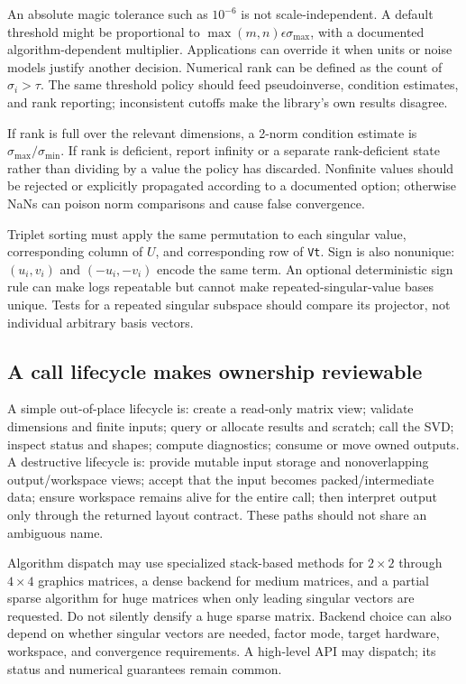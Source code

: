 An absolute magic tolerance such as \(10^{-6}\) is not scale-independent. A default threshold might be proportional to \(\max(m,n)\epsilon\sigma_{\max}\), with a documented algorithm-dependent multiplier. Applications can override it when units or noise models justify another decision. Numerical rank can be defined as the count of \(\sigma_i>\tau\). The same threshold policy should feed pseudoinverse, condition estimates, and rank reporting; inconsistent cutoffs make the library's own results disagree.

If rank is full over the relevant dimensions, a 2-norm condition estimate is \(\sigma_{\max}/\sigma_{\min}\). If rank is deficient, report infinity or a separate rank-deficient state rather than dividing by a value the policy has discarded. Nonfinite values should be rejected or explicitly propagated according to a documented option; otherwise NaNs can poison norm comparisons and cause false convergence.

Triplet sorting must apply the same permutation to each singular value, corresponding column of \(U\), and corresponding row of \texttt{Vt}. Sign is also nonunique: \((u_i,v_i)\) and \((-u_i,-v_i)\) encode the same term. An optional deterministic sign rule can make logs repeatable but cannot make repeated-singular-value bases unique. Tests for a repeated singular subspace should compare its projector, not individual arbitrary basis vectors.

\subsection{A call lifecycle makes ownership reviewable}\label{a-call-lifecycle-makes-ownership-reviewable}

A simple out-of-place lifecycle is: create a read-only matrix view; validate dimensions and finite inputs; query or allocate results and scratch; call the SVD; inspect status and shapes; compute diagnostics; consume or move owned outputs. A destructive lifecycle is: provide mutable input storage and nonoverlapping output/workspace views; accept that the input becomes packed/intermediate data; ensure workspace remains alive for the entire call; then interpret output only through the returned layout contract. These paths should not share an ambiguous name.

Algorithm dispatch may use specialized stack-based methods for \(2\times2\) through \(4\times4\) graphics matrices, a dense backend for medium matrices, and a partial sparse algorithm for huge matrices when only leading singular vectors are requested. Do not silently densify a huge sparse matrix. Backend choice can also depend on whether singular vectors are needed, factor mode, target hardware, workspace, and convergence requirements. A high-level API may dispatch; its status and numerical guarantees remain common.

